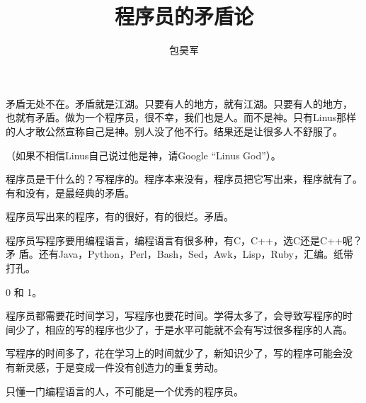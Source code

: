 \documentclass[10pt]{article}
\begin{document}
\begin{CJK*}{UTF8}{simsun}
\CJKtilde

\title{程序员的矛盾论}
\date{}
\author{包昊军}
\maketitle

\section{}

矛盾无处不在。矛盾就是江湖。只要有人的地方，就有江湖。只要有人的地方，
也就有矛盾。做为一个程序员，很不幸，我们也是人。而不是神。只有Linus那样
的人才敢公然宣称自己是神。别人没了他不行。结果还是让很多人不舒服了。

（如果不相信Linus自己说过他是神，请Google “Linus God”）。

程序员是干什么的？写程序的。程序本来没有，程序员把它写出来，程序就有了。
有和没有，是最经典的矛盾。

程序员写出来的程序，有的很好，有的很烂。矛盾。

程序员写程序要用编程语言，编程语言有很多种，有C，C++，选C还是C++呢？矛
盾。还有Java，Python，Perl，Bash，Sed，Awk，Lisp，Ruby，汇编。纸带打孔。

0 和 1。

程序员都需要花时间学习，写程序也要花时间。学得太多了，会导致写程序的时
间少了，相应的写的程序也少了，于是水平可能就不会有写过很多程序的人高。

写程序的时间多了，花在学习上的时间就少了，新知识少了，写的程序可能会没
有新灵感，于是变成一件没有创造力的重复劳动。



只懂一门编程语言的人，不可能是一个优秀的程序员。


\end{CJK*}
\end{document}
